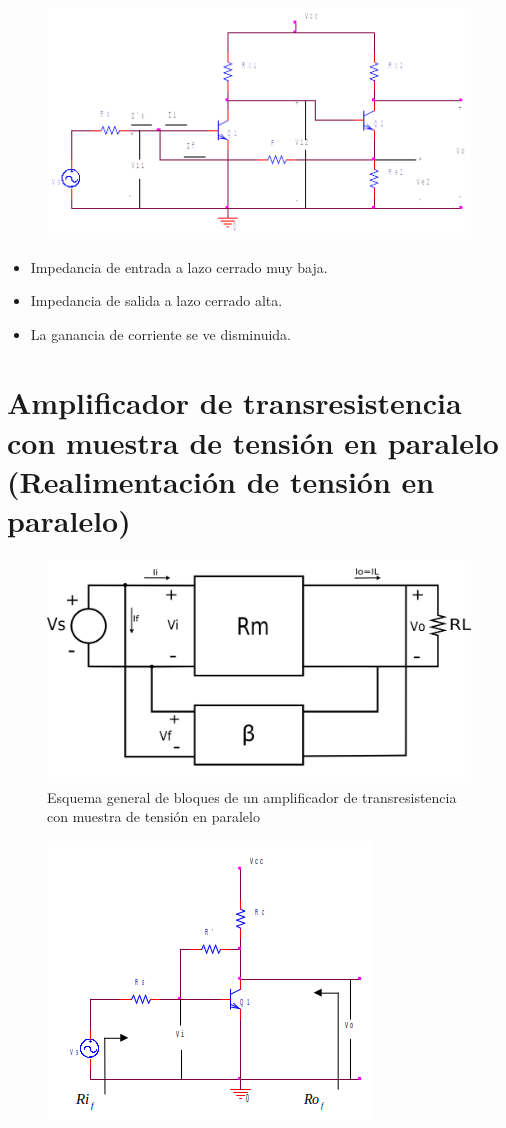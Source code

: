 \newpage

\begin{figure}[h]
	\includegraphics[width=0.8\linewidth]{./img/esq3.png}
	\centering
	\label{fig:esq_amp3}
\end{figure}

\begin{itemize}
	\item Impedancia de entrada a lazo cerrado muy baja.
	\item Impedancia de salida a lazo cerrado alta.
	\item La ganancia de corriente se ve disminuida.
\end{itemize}

\section{Amplificador de transresistencia con muestra de tensión en paralelo (Realimentación de tensión en paralelo)}

\begin{figure}[h]
	\includegraphics[width=0.8\linewidth]{./img/4.png}
	\centering
	\caption{Esquema general de bloques de un amplificador de transresistencia con muestra de tensión en paralelo}
	\label{fig:amp4}
\end{figure}
\newpage
\begin{figure}[h]
	\includegraphics[width=0.5\linewidth]{./img/esq4.png}
	\centering
	\label{fig:esq_amp4}
\end{figure}

